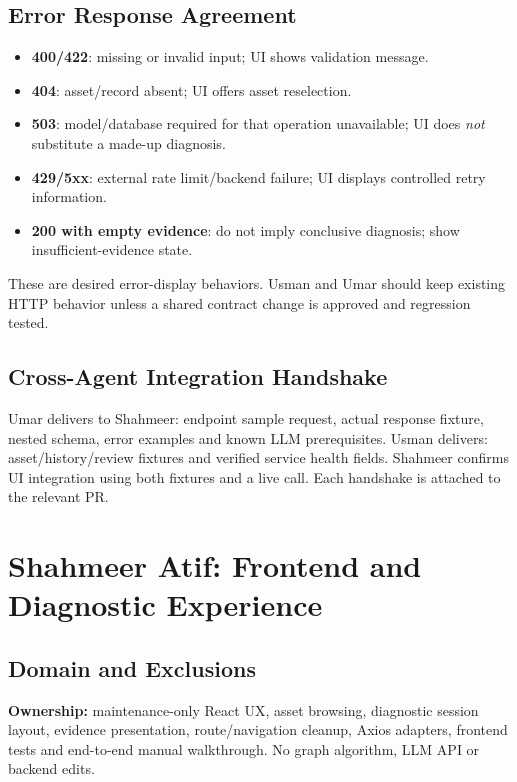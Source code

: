 \documentclass[11pt,a4paper,oneside]{report}
\newcommand{\file}[1]{\path{#1}}
\begin{document}
\section{Error Response Agreement}
\begin{itemize}
\item \textbf{400/422}: missing or invalid input; UI shows validation message.
\item \textbf{404}: asset/record absent; UI offers asset reselection.
\item \textbf{503}: model/database required for that operation unavailable; UI does \emph{not} substitute a made-up diagnosis.
\item \textbf{429/5xx}: external rate limit/backend failure; UI displays controlled retry information.
\item \textbf{200 with empty evidence}: do not imply conclusive diagnosis; show insufficient-evidence state.
\end{itemize}
These are desired error-display behaviors. Usman and Umar should keep existing HTTP behavior unless a shared contract change is approved and regression tested.

\section{Cross-Agent Integration Handshake}
Umar delivers to Shahmeer: endpoint sample request, actual response fixture, nested \file{ranked_checks} schema, error examples and known LLM prerequisites. Usman delivers: asset/history/review fixtures and verified service health fields. Shahmeer confirms UI integration using both fixtures and a live call. Each handshake is attached to the relevant PR.

\chapter{Shahmeer Atif: Frontend and Diagnostic Experience}
\section{Domain and Exclusions}
\textbf{Ownership:} maintenance-only React UX, asset browsing, diagnostic session layout, evidence presentation, route/navigation cleanup, Axios adapters, frontend tests and end-to-end manual walkthrough. No graph algorithm, LLM API or backend edits.
\end{document}
